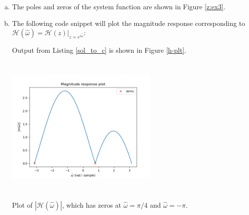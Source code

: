 \begin{enumerate}
\begin{enumerate}[a)]
\begin{marginfigure}
\begin{center}
\end{center}
\caption{The zeros of the system function $\mathcal{H}(z)$,
have $\alpha_k=\{e^{i\pi/4},e^{-i\pi}\}$. Zeros are marked with blue
    circles and poles are marked with red crosses.}
\label{z:ex3}
\end{marginfigure}

\item The poles and zeros of the system function are shown in Figure \ref{z:ex3}. 

\item The following code snippet will plot the magnitude response corresponding to $\mathcal{H}(\hat{\omega})=\mathcal{H}(z)|_{z=e^{i\hat{\omega}}}$:


Output from Listing \ref{sol_to_c} is shown in Figure \ref{h-plt}.

\begin{marginfigure}
\includegraphics[width=7.5cm,height=7.0cm]{ch18/figures/magnituderes.png}
\caption{Plot of $|\mathcal{H}(\hat{\omega})|$, which has zeros at $\hat{\omega}=\pi/4$ and $\hat{\omega}=-\pi$.}
\label{h-plt}
\end{marginfigure}


\end{enumerate}
\end{enumerate}
